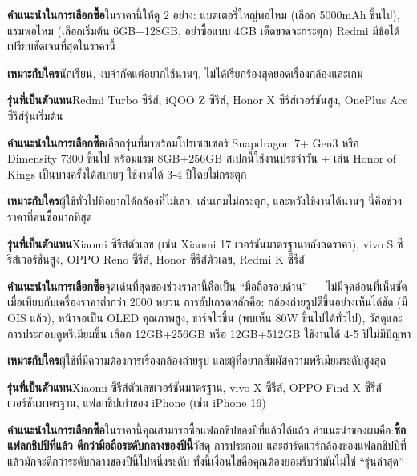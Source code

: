 \textbf{คำแนะนำในการเลือกซื้อ}ในราคานี้ให้ดู 2 อย่าง: แบตเตอรี่ใหญ่พอไหม (เลือก 5000mAh ขึ้นไป), แรมพอไหม (เลือกเริ่มต้น 6GB+128GB, อย่าซื้อแบบ 4GB เด็ดขาดจะกระตุก) Redmi มีข้อได้เปรียบชัดเจนที่สุดในราคานี้


\textbf{เหมาะกับใคร}นักเรียน, งบจำกัดแต่อยากใช้นานๆ, ไม่ได้เรียกร้องสุดยอดเรื่องกล้องและเกม

\textbf{รุ่นที่เป็นตัวแทน}Redmi Turbo ซีรีส์, iQOO Z ซีรีส์, Honor X ซีรีส์เวอร์ชันสูง, OnePlus Ace ซีรีส์รุ่นเริ่มต้น

\textbf{คำแนะนำในการเลือกซื้อ}เลือกรุ่นที่มาพร้อมโปรเซสเซอร์ Snapdragon 7+ Gen3 หรือ Dimensity 7300 ขึ้นไป พร้อมแรม 8GB+256GB สเปกนี้ใช้งานประจำวัน + เล่น Honor of Kings เป็นบางครั้งได้สบายๆ ใช้งานได้ 3-4 ปีโดยไม่กระตุก


\textbf{เหมาะกับใคร}ผู้ใช้ทั่วไปที่อยากได้กล้องที่ไม่เลว, เล่นเกมไม่กระตุก, และหวังใช้งานได้นานๆ นี่คือช่วงราคาที่คนซื้อมากที่สุด

\textbf{รุ่นที่เป็นตัวแทน}Xiaomi ซีรีส์ตัวเลข (เช่น Xiaomi 17 เวอร์ชันมาตรฐานหลังลดราคา), vivo S ซีรีส์เวอร์ชันสูง, OPPO Reno ซีรีส์, Honor ซีรีส์ตัวเลข, Redmi K ซีรีส์

\textbf{คำแนะนำในการเลือกซื้อ}จุดเด่นที่สุดของช่วงราคานี้คือเป็น “มือถือรอบด้าน” — ไม่มีจุดอ่อนที่เห็นชัด เมื่อเทียบกับเครื่องราคาต่ำกว่า 2000 หยวน การอัปเกรดหลักคือ: กล้องถ่ายรูปดีขึ้นอย่างเห็นได้ชัด (มี OIS แล้ว), หน้าจอเป็น OLED คุณภาพสูง, ชาร์จไวขึ้น (พบเห็น 80W ขึ้นไปได้ทั่วไป), วัสดุและการประกอบดูพรีเมียมขึ้น เลือก 12GB+256GB หรือ 12GB+512GB ใช้งานได้ 4-5 ปีไม่มีปัญหา


\textbf{เหมาะกับใคร}ผู้ใช้ที่มีความต้องการเรื่องกล้องถ่ายรูป และผู้ที่อยากสัมผัสความพรีเมียมระดับสูงสุด

\textbf{รุ่นที่เป็นตัวแทน}Xiaomi ซีรีส์ตัวเลขเวอร์ชันมาตรฐาน, vivo X ซีรีส์, OPPO Find X ซีรีส์เวอร์ชันมาตรฐาน, แฟลกชิปเก่าของ iPhone (เช่น iPhone 16)

\textbf{คำแนะนำในการเลือกซื้อ}ในราคานี้คุณสามารถซื้อแฟลกชิปของปีที่แล้วได้แล้ว คำแนะนำของผมคือ:\textbf{ซื้อแฟลกชิปปีที่แล้ว ดีกว่ามือถือระดับกลางของปีนี้}วัสดุ การประกอบ และฮาร์ดแวร์กล้องของแฟลกชิปปีที่แล้วมักจะดีกว่าระดับกลางของปีนี้ไปหนึ่งระดับ ทั้งนี้เงื่อนไขคือคุณต้องยอมรับว่ามันไม่ใช่ “รุ่นล่าสุด”

